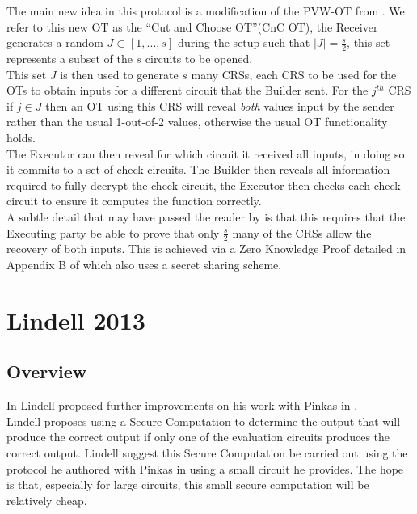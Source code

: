 \documentclass[ %
                    author={Nicholas Tutte},
                supervisor={Prof. Nigel Smart},
                    degree={MEng},
                     title={Secure Two Party Computation},
                  subtitle={A practical comparison of recent protocols},
                      type={Research - GG1K},
                      year={2015} ]{dissertation}
\begin{document}
				The main new idea in this protocol is a modification of the PVW-OT from \cite{PVW_OT_2008}. We refer to this new OT as the ``Cut and Choose OT''(CnC OT), the Receiver generates a random $J \subset [1, ..., s]$ during the setup such that $\vert J \vert = \frac{s}{2}$, this set represents a subset of the $s$ circuits to be opened.\\

				This set $J$ is then used to generate $s$ many CRSs, each CRS to be used for the OTs to obtain inputs for a different circuit that the Builder sent. For the $j^{th}$ CRS if $j \in J$ then an OT using this CRS will reveal \emph{both} values input by the sender rather than the usual 1-out-of-2 values, otherwise the usual OT functionality holds.\\

				The Executor can then reveal for which circuit it received all inputs, in doing so it commits to a set of check circuits. The Builder then reveals all information required to fully decrypt the check circuit, the Executor then checks each check circuit to ensure it computes the function correctly.\\

				A subtle detail that may have passed the reader by is that this requires that the Executing party be able to prove that only $\frac{s}{2}$ many of the CRSs allow the recovery of both inputs. This is achieved via a Zero Knowledge Proof detailed in Appendix B of \cite{LindellAndPinkas2011} which also uses a secret sharing scheme.

		\section{Lindell 2013}
			\subsection*{Overview}

				In \cite{Lindell_CnC_2013} Lindell proposed further improvements on his work with Pinkas in \cite{LindellAndPinkas2011}.\\%

				Lindell proposes using a Secure Computation to determine the output that will produce the correct output if only one of the evaluation circuits produces the correct output. Lindell suggest this Secure Computation be carried out using the protocol he authored with Pinkas in \cite{LindellAndPinkas2011} using a small circuit he provides. The hope is that, especially for large circuits, this small secure computation will be relatively cheap.\\
\end{document}
